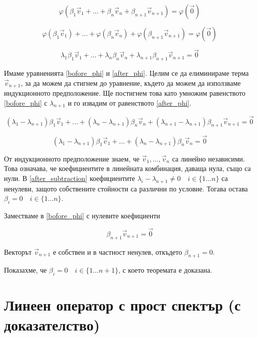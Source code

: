 \documentclass{scrartcl}
\begin{document}
\begin{FlushLeft}
$$\varphi(\beta_1 \vec{v}_1 + \dots + \beta_n \vec{v}_n + \beta_{n+1} \vec{v}_{n+1}) = \varphi(\vec{0})$$

$$\varphi(\beta_1 \vec{v}_1) + \dots + \varphi(\beta_n \vec{v}_n) + \varphi(\beta_{n+1} \vec{v}_{n+1}) = \varphi(\vec{0})$$

\begin{equation}
    \lambda_1\beta_1 \vec{v}_1 + \dots + \lambda_n\beta_n \vec{v}_n + \lambda_{n+1}\beta_{n+1} \vec{v}_{n+1} = \vec{0} \label{after_phi}
\end{equation}

Имаме уравненията \eqref{bofore_phi} и \eqref{after_phi}. Целим се да елиминираме терма $\vec{v}_{n+1}$, за да можем да стигнем до уравнение, където да можем да използваме индукционното предположение. Ще постигнем това като умножим равенството \eqref{bofore_phi} с $\lambda_{n+1}$ и го извадим от равенството \eqref{after_phi}.

$$(\lambda_1 - \lambda_{n+1})\beta_1 \vec{v}_1 + \dots + (\lambda_n - \lambda_{n+1})\beta_n \vec{v}_n + (\lambda_{n+1} - \lambda_{n+1})\beta_{n+1} \vec{v}_{n+1} = \vec{0}$$

\begin{equation}
    (\lambda_1 - \lambda_{n+1})\beta_1 \vec{v}_1 + \dots + (\lambda_n - \lambda_{n+1})\beta_n \vec{v}_n = \vec{0} \label{after_subtraction}
\end{equation}

От индукционното предположение знаем, че $\vec{v}_1, \dots, \vec{v}_n$ са линейно независими. Това означава, че коефициентите в линейната комбинация, даваща нула, също са нули. В \eqref{after_subtraction} коефициентите $\lambda_i - \lambda_{n+1} \ne 0 \quad i \in \{1 \dots n\}$ са ненулеви, защото собствените стойности са различни по условие. Тогава остава $\beta_i = 0 \quad i \in \{1 \dots n\}$.

Заместваме в \eqref{bofore_phi} с нулевите коефициенти

$$\beta_{n+1} \vec{v}_{n+1} = \vec{0}$$

Векторът $\vec{v}_{n+1}$ е собствен и в частност ненулев, откъдето $\beta_{n+1} = 0$.

Показахме, че $\beta_i = 0 \quad i \in \{1 \dots n+1\}$, с което теоремата е доказана.

\section{Линеен оператор с прост спектър (с доказателство)}


\end{FlushLeft}
\end{document}
